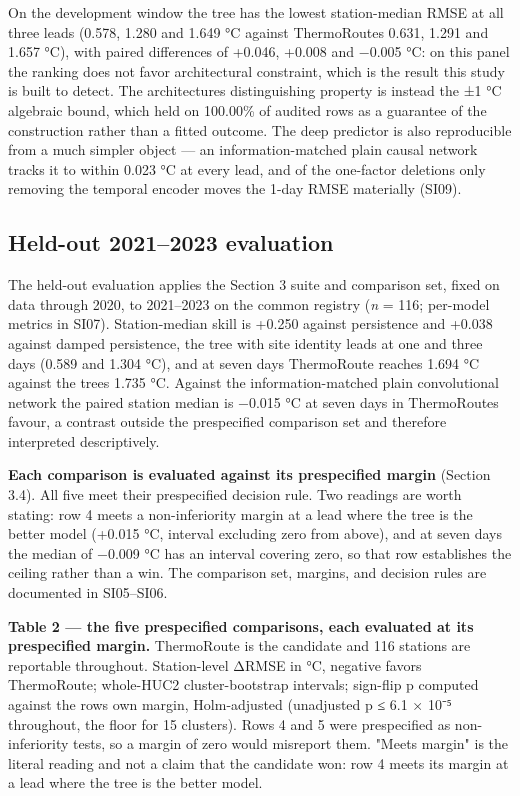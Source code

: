 On the development window the tree has the lowest station-median RMSE at all
three leads (0.578, 1.280 and 1.649 °C against ThermoRoute\textquotesingle s 0.631, 1.291 and
1.657 °C), with paired differences of +0.046, +0.008 and −0.005 °C: on this
panel the ranking does not favor architectural constraint, which is the result
this study is built to detect. The architecture\textquotesingle s distinguishing property is
instead the ±1 °C algebraic bound, which held on 100.00\% of audited rows as a
guarantee of the construction rather than a fitted outcome. The deep predictor
is also reproducible from a much simpler object --- an information-matched plain
causal network tracks it to within 0.023 °C at every lead, and of the one-factor
deletions only removing the temporal encoder moves the 1-day RMSE materially
(SI09).

\subsection{Held-out 2021--2023 evaluation}\label{held-out-20212023-evaluation}

The held-out evaluation applies the Section 3 suite and comparison set, fixed on
data through 2020, to 2021--2023 on the common registry (\emph{n} = 116; per-model
metrics in SI07). Station-median skill is +0.250 against persistence and +0.038
against damped persistence, the tree with site identity leads at one and three
days (0.589 and 1.304 °C), and at seven days ThermoRoute reaches 1.694 °C
against the tree\textquotesingle s 1.735 °C. Against the information-matched plain convolutional
network the paired station median is −0.015 °C at seven days in ThermoRoute\textquotesingle s
favour, a contrast outside the prespecified comparison set and therefore
interpreted descriptively.

\textbf{Each comparison is evaluated against its prespecified margin} (Section 3.4).
All five meet their prespecified decision rule. Two readings are worth stating: row 4
meets a non-inferiority margin at a lead where the tree is the better model
(+0.015 °C, interval excluding zero from above), and at seven days the median of
−0.009 °C has an interval covering zero, so that row establishes the ceiling
rather than a win. The comparison set, margins, and decision rules are
documented in SI05--SI06.

\textbf{Table 2 --- the five prespecified comparisons, each evaluated at its
prespecified margin.} ThermoRoute is
the candidate and 116 stations are reportable throughout. Station-level ΔRMSE in
°C, negative favors ThermoRoute; whole-HUC2 cluster-bootstrap intervals; sign-flip
p computed against the row\textquotesingle s own margin, Holm-adjusted (unadjusted p ≤ 6.1 × 10⁻⁵
throughout, the floor for 15 clusters). Rows 4 and 5 were prespecified as
non-inferiority tests, so a margin of zero would misreport them. "Meets margin"
is the literal reading and not a claim that the candidate won: row 4 meets its
margin at a lead where the tree is the better model.

